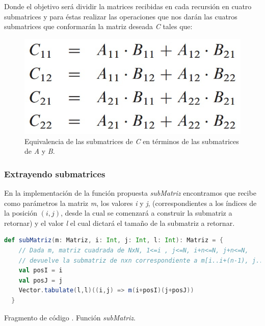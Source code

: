\documentclass{article}
\newcounter{codesnippet}
\newcommand{\newcodesnippet}{%
  \stepcounter{codesnippet}%
}
\begin{document}
Donde el objetivo será dividir la matrices recibidas en cada recursión en cuatro submatrices y para éstas realizar las operaciones que nos darán las cuatros submatrices que conformarán la matriz deseada \textit{C} tales que:

\begin{figure}[h]
    \begin{minipage}{1\textwidth}
        \centering
        \includegraphics[scale=0.25]{Imagen3.png}
        \caption{Equivalencia de las submatrices de \textit{C} en términos de las submatrices de \textit{A} y \textit{B}.}
        \label{1}
    \end{minipage}
\end{figure}

\subsubsection{Extrayendo submatrices}

En la implementación de la función propuesta \textit{subMatriz} encontramos que recibe como parámetros la matriz \textit{m}, los valores \textit{i} y \textit{j}, (correspondientes a los índices de la posición \((i,j)\), desde la cual se comenzará a construir la submatriz a retornar) y el valor \textit{l} el cual dictará el tamaño de la submatriz a retornar. 

\newcodesnippet
\begin{lstlisting}[language=Scala]
  def subMatriz(m: Matriz, i: Int, j: Int, l: Int): Matriz = {
    // Dada m, matriz cuadrada de NxN, 1<=i , j<=N, i+n<=N, j+n<=N,
    // devuelve la submatriz de nxn correspondiente a m[i..i+(n-1), j..j+(n-1)]
    val posI = i
    val posJ = j
    Vector.tabulate(l,l)((i,j) => m(i+posI)(j+posJ))
  }
\end{lstlisting}
\begin{center}
    \small{Fragmento de código \thecodesnippet. Función \textit{subMatriz}.}
\end{center}
\end{document}
